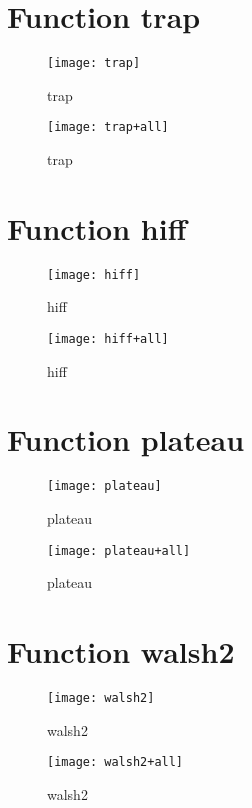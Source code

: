 \section{Function trap}
\begin{center}

\end{center}
\begin{center}

\end{center}
\begin{figure}[h]
\centering
\texttt{[image: trap]}
\caption{trap}
\end{figure}
\begin{figure}[h]
\centering
\texttt{[image: trap+all]}
\caption{trap}
\end{figure}
\newpage
\section{Function hiff}
\begin{center}

\end{center}
\begin{center}

\end{center}
\begin{figure}[h]
\centering
\texttt{[image: hiff]}
\caption{hiff}
\end{figure}
\begin{figure}[h]
\centering
\texttt{[image: hiff+all]}
\caption{hiff}
\end{figure}
\newpage
\section{Function plateau}
\begin{center}

\end{center}
\begin{center}

\end{center}
\begin{figure}[h]
\centering
\texttt{[image: plateau]}
\caption{plateau}
\end{figure}
\begin{figure}[h]
\centering
\texttt{[image: plateau+all]}
\caption{plateau}
\end{figure}
\newpage
\section{Function walsh2}
\begin{center}

\end{center}
\begin{center}

\end{center}
\begin{figure}[h]
\centering
\texttt{[image: walsh2]}
\caption{walsh2}
\end{figure}
\begin{figure}[h]
\centering
\texttt{[image: walsh2+all]}
\caption{walsh2}
\end{figure}
